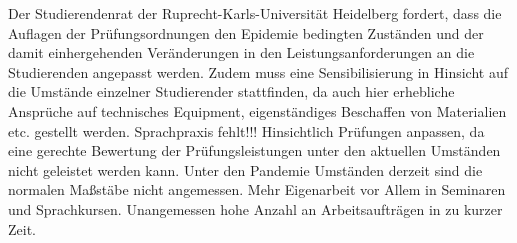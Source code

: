     {
        Der Studierendenrat der Ruprecht-Karls-Universität Heidelberg fordert, dass die
        Auflagen der Prüfungsordnungen den Epidemie bedingten Zuständen und der damit
        einhergehenden Veränderungen in den Leistungsanforderungen an die Studierenden
        angepasst werden. Zudem muss eine Sensibilisierung in Hinsicht auf die Umstände
        einzelner Studierender stattfinden, da auch hier erhebliche Ansprüche auf technisches
        Equipment, eigenständiges Beschaffen von Materialien etc. gestellt werden.
        Sprachpraxis fehlt!!! Hinsichtlich Prüfungen anpassen, da eine gerechte Bewertung der
        Prüfungsleistungen unter den aktuellen Umständen nicht geleistet werden kann. Unter
        den Pandemie Umständen derzeit sind die normalen Maßstäbe nicht angemessen.
        Mehr Eigenarbeit vor Allem in Seminaren und Sprachkursen. Unangemessen hohe
        Anzahl an Arbeitsaufträgen in zu kurzer Zeit.
    }{
    }{
    }{
    }
